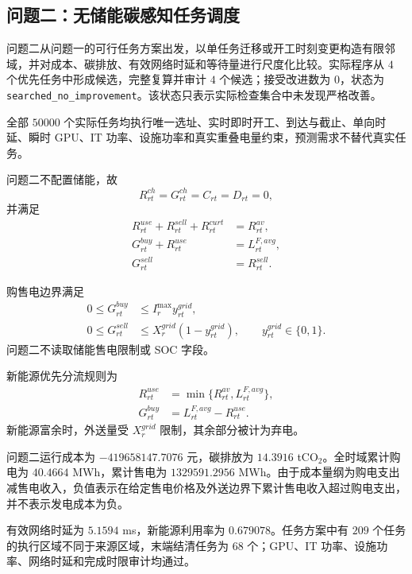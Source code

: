 \documentclass[withoutpreface,bwprint]{cumcmthesis}
\begin{document}
\subsection{问题二：无储能碳感知任务调度}

问题二从问题一的可行任务方案出发，以单任务迁移或开工时刻变更构造有限邻域，并对成本、碳排放、有效网络时延和等待量进行尺度化比较。实际程序从 $4$ 个优先任务中形成候选，完整复算并审计 $4$ 个候选；接受改进数为 $0$，状态为 \texttt{searched\_no\_improvement}。该状态只表示实际检查集合中未发现严格改善。

全部 $50000$ 个实际任务均执行唯一选址、实时即时开工、到达与截止、单向时延、瞬时 GPU、IT 功率、设施功率和真实重叠电量约束，预测需求不替代真实任务。

问题二不配置储能，故
\begin{equation}
R_{rt}^{ch}=G_{rt}^{ch}=C_{rt}=D_{rt}=0,
\end{equation}
并满足
\begin{align}
R_{rt}^{use}+R_{rt}^{sell}+R_{rt}^{curt}&=R_{rt}^{av},\\
G_{rt}^{buy}+R_{rt}^{use}&=L_{rt}^{F,avg},\\
G_{rt}^{sell}&=R_{rt}^{sell}.
\end{align}

购售电边界满足
\begin{align}
0\le G_{rt}^{buy}&\le I_r^{\max}y_{rt}^{grid},\\
0\le G_{rt}^{sell}&\le X_r^{grid}(1-y_{rt}^{grid}),
\qquad y_{rt}^{grid}\in\{0,1\}.
\end{align}
问题二不读取储能售电限制或 SOC 字段。

新能源优先分流规则为
\begin{align}
R_{rt}^{use}&=\min\{R_{rt}^{av},L_{rt}^{F,avg}\},\\
G_{rt}^{buy}&=L_{rt}^{F,avg}-R_{rt}^{use}.
\end{align}
新能源富余时，外送量受 $X_r^{grid}$ 限制，其余部分被计为弃电。

问题二运行成本为 $-419658147.7076$ 元，碳排放为 $14.3916$ tCO$_2$。全时域累计购电为 $40.4664$ MWh，累计售电为 $1329591.2956$ MWh。由于成本量纲为购电支出减售电收入，负值表示在给定售电价格及外送边界下累计售电收入超过购电支出，并不表示发电成本为负。

有效网络时延为 $5.1594$ ms，新能源利用率为 $0.679078$。任务方案中有 $209$ 个任务的执行区域不同于来源区域，末端结清任务为 $68$ 个；GPU、IT 功率、设施功率、网络时延和完成时限审计均通过。
\end{document}
